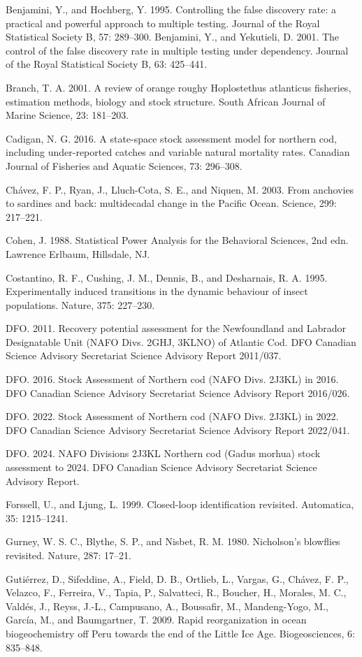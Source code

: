 \documentclass[11pt]{article}
\begin{document}
Benjamini, Y., and Hochberg, Y. 1995. Controlling the false discovery
rate: a practical and powerful approach to multiple testing. Journal of
the Royal Statistical Society B, 57: 289--300. Benjamini, Y., and
Yekutieli, D. 2001. The control of the false discovery rate in multiple
testing under dependency. Journal of the Royal Statistical Society B,
63: 425--441.

Branch, T. A. 2001. A review of orange roughy Hoplostethus atlanticus
fisheries, estimation methods, biology and stock structure. South
African Journal of Marine Science, 23: 181--203.

Cadigan, N. G. 2016. A state-space stock assessment model for northern
cod, including under-reported catches and variable natural mortality
rates. Canadian Journal of Fisheries and Aquatic Sciences, 73: 296--308.

Ch\'avez, F. P., Ryan, J., Lluch-Cota, S. E., and Niquen, M. 2003. From
anchovies to sardines and back: multidecadal change in the Pacific
Ocean. Science, 299: 217--221.

Cohen, J. 1988. Statistical Power Analysis for the Behavioral Sciences,
2nd edn. Lawrence Erlbaum, Hillsdale, NJ.

Costantino, R. F., Cushing, J. M., Dennis, B., and Desharnais, R. A.
1995. Experimentally induced transitions in the dynamic behaviour of
insect populations. Nature, 375: 227--230.

DFO. 2011. Recovery potential assessment for the Newfoundland and
Labrador Designatable Unit (NAFO Divs. 2GHJ, 3KLNO) of Atlantic Cod. DFO
Canadian Science Advisory Secretariat Science Advisory Report 2011/037.

DFO. 2016. Stock Assessment of Northern cod (NAFO Divs. 2J3KL) in 2016.
DFO Canadian Science Advisory Secretariat Science Advisory Report
2016/026.

DFO. 2022. Stock Assessment of Northern cod (NAFO Divs. 2J3KL) in 2022.
DFO Canadian Science Advisory Secretariat Science Advisory Report
2022/041.

DFO. 2024. NAFO Divisions 2J3KL Northern cod (Gadus morhua) stock
assessment to 2024. DFO Canadian Science Advisory Secretariat Science
Advisory Report.

Forssell, U., and Ljung, L. 1999. Closed-loop identification revisited.
Automatica, 35: 1215--1241.

Gurney, W. S. C., Blythe, S. P., and Nisbet, R. M. 1980. Nicholson's
blowflies revisited. Nature, 287: 17--21.

Guti\'errez, D., Sifeddine, A., Field, D. B., Ortlieb, L., Vargas, G.,
Ch\'avez, F. P., Velazco, F., Ferreira, V., Tapia, P., Salvatteci, R.,
Boucher, H., Morales, M. C., Vald\'es, J., Reyss, J.-L., Campusano, A.,
Boussafir, M., Mandeng-Yogo, M., Garc\'ia, M., and Baumgartner, T. 2009.
Rapid reorganization in ocean biogeochemistry off Peru towards the end
of the Little Ice Age. Biogeosciences, 6: 835--848.
\end{document}
